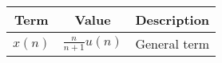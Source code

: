   
  \begin{tabular}{|c|c|c|}
    \hline
    \textbf{Term} & \textbf{Value} & \textbf{Description}\\
    \hline
    $x(n)$ & $\frac{n}{n+1}$$u(n)$ & General term\\
    \hline
  \end{tabular}
  
